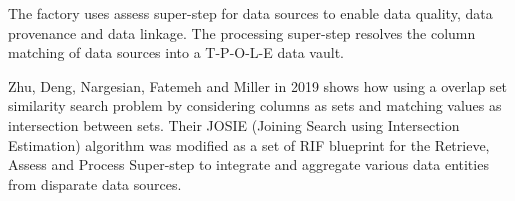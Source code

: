 {\color{red}{AFV:
We need a basic virus spread prediction here to use as a theoretic compare to the reality of the data.

TW: do we really need a model like this for this first paper? maybe some kind of visualisation of what you have compiled on data can already reveal some trends or contradictions published about spread and measures.

Suggest a spread from Heathrow by 1 person on a day by day - post code by post code in UK

If it works we test it on another country also.

TW: did not find this info mentioned above (spread from Heathrow). Below two different approaches (1-traditional and 2-out of the box..)









}}

The factory uses assess super-step \cite{Vermeulen2018ass} for {\color{red}{??}} data sources to enable data quality, data provenance and data linkage. The processing super-step \cite{Vermeulen2018prc} resolves the column matching of data sources into a T-P-O-L-E data vault. 

Zhu, Deng, Nargesian, Fatemeh and Miller in 2019 \cite{zhu2019josie} shows how using a overlap set similarity search problem by considering columns as sets and matching values as intersection between sets. Their JOSIE (Joining Search using Intersection Estimation) algorithm was modified as a set of RIF blueprint for the Retrieve, Assess and Process Super-step to integrate and aggregate various data entities from disparate data sources.

